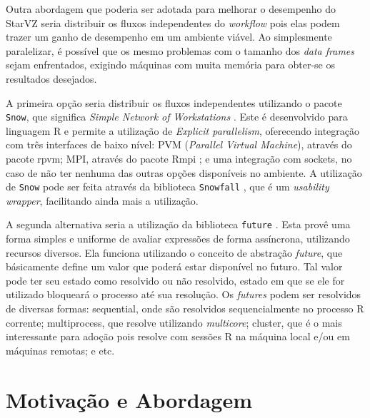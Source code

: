 Outra abordagem que poderia ser adotada para melhorar o desempenho do StarVZ 
seria distribuir os fluxos independentes
do \emph{workflow} pois elas podem trazer um ganho de desempenho em um ambiente 
viável.
Ao simplesmente paralelizar, é possível que os mesmo problemas com o tamanho 
dos 
\emph{data frames} sejam enfrentados, exigindo
máquinas com muita memória para obter-se os resultados desejados. 

A primeira opção seria distribuir os fluxos independentes utilizando o pacote 
\texttt{Snow}, que significa 
\emph{Simple Network of Workstations} \cite{ref:snow}. Este é desenvolvido para 
linguagem R e permite a utilização
de \emph{Explicit parallelism}, oferecendo integração com três interfaces de 
baixo nível: PVM (\emph{Parallel Virtual Machine}), através do pacote rpvm; 
MPI, 
através do pacote Rmpi \cite{ref:rmpi}; e uma integração com sockets, no caso 
de 
não ter nenhuma das outras 
opções disponíveis no ambiente. A utilização de \texttt{Snow} pode ser feita 
através da biblioteca \texttt{Snowfall} \cite{ref:snowfall},
que é um \emph{usability wrapper}, facilitando ainda mais a utilização.

A segunda alternativa seria a utilização da biblioteca \texttt{future} 
\cite{ref:future}. Esta provê uma forma simples e uniforme 
de avaliar expressões de forma assíncrona, utilizando recursos diversos. Ela 
funciona utilizando o conceito de abstração 
\emph{future}, que básicamente define um valor que poderá estar disponível no 
futuro. Tal valor pode ter seu estado como 
resolvido ou não resolvido, estado em que se ele for utilizado bloqueará o 
processo até sua resolução. Os \emph{futures} 
podem ser resolvidos de diversas formas: sequential, onde são resolvidos 
sequencialmente no processo R corrente; multiprocess,
que resolve utilizando \emph{multicore}; cluster, que é o mais interessante 
para 
adoção pois resolve com sessões R na máquina 
local e/ou em máquinas remotas; e etc.

\section{Motivação e Abordagem}\label{sect:motivation}
